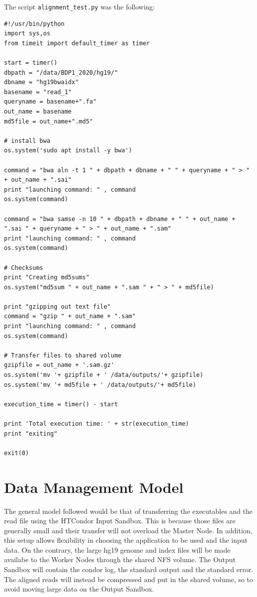 \documentclass{article}
\begin{document}
The script \texttt{alignment\_test.py} was the following:

\begin{lstlisting}
#!/usr/bin/python
import sys,os
from timeit import default_timer as timer

start = timer()
dbpath = "/data/BDP1_2020/hg19/"
dbname = "hg19bwaidx"
basename = "read_1"
queryname = basename+".fa"
out_name = basename 
md5file = out_name+".md5"

# install bwa
os.system('sudo apt install -y bwa')

command = "bwa aln -t 1 " + dbpath + dbname + " " + queryname + " > " + out_name + ".sai"
print "launching command: " , command
os.system(command)

command = "bwa samse -n 10 " + dbpath + dbname + " " + out_name + ".sai " + queryname + " > " + out_name + ".sam"
print "launching command: " , command
os.system(command)

# Checksums
print "Creating md5sums"
os.system("md5sum " + out_name + ".sam " + " > " + md5file)

print "gzipping out text file"
command = "gzip " + out_name + ".sam"
print "launching command: " , command
os.system(command)

# Transfer files to shared volume
gzipfile = out_name + '.sam.gz'
os.system('mv '+ gzipfile + ' /data/outputs/'+ gzipfile)
os.system('mv '+ md5file + ' /data/outputs/'+ md5file)

execution_time = timer() - start

print 'Total execution time: ' + str(execution_time)
print "exiting"

exit(0)
\end{lstlisting}

\section{Data Management Model}
The general model followed would be that of transferring the executables and the read file using the HTCondor Input Sandbox.
This is because those files are generally small and their transfer will not overload the Master Node.
In addition, this setup allows flexibility in choosing the application to be used and the input data.
On the contrary, the large hg19 genome and index files will be made availabe to the Worker Nodes through the shared NFS volume.
The Output Sandbox will contain the condor log, the standard output and the standard error.
The aligned reads will instead be compressed and put in the shared volume, so to avoid moving large data on the Output Sandbox.
\end{document}
